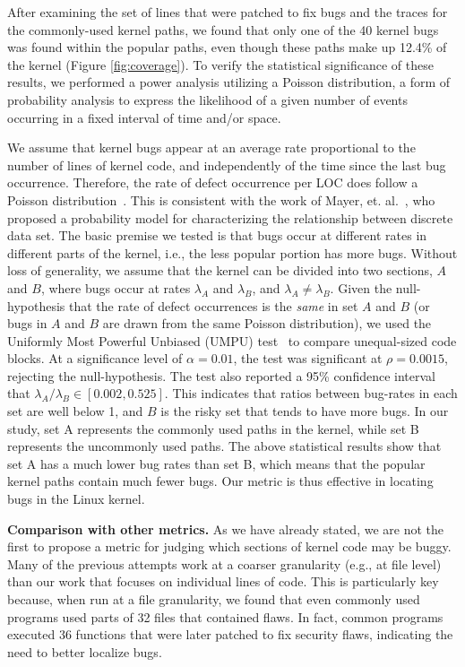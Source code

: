 After examining the set of lines that were patched to fix bugs and the traces for
the commonly-used kernel paths, we found that only one of the 40 kernel bugs
was found within the popular paths, even though these paths make up 12.4\% of the kernel 
(Figure \ref{fig:coverage}). 
To verify the statistical significance of these results, we performed a power
analysis utilizing a Poisson distribution, a form of probability analysis to express the
likelihood of a given number of events occurring in a fixed interval of time
and/or space.

We assume that kernel bugs appear at an average rate proportional to the
number of lines of kernel code, and independently of the time since the last
bug occurrence. Therefore, the rate of defect occurrence per LOC does
follow a Poisson distribution~\cite{Poisson-distribution}.
This is consistent with the work of Mayer, et. al.~\cite{mayer1989probability}, who
proposed a probability model for characterizing the relationship between discrete
data set.
The basic premise we tested is that bugs occur at different rates in different
parts of the kernel,
i.e., the less popular portion has more bugs. Without
loss of generality, we assume that the kernel can be divided into two sections,
$A$ and $B$, where bugs occur at rates $\lambda_A$ and
$\lambda_B$, and $\lambda_A \neq \lambda_B$. Given the null-hypothesis
that the rate of defect occurrences is the \textit{same} in set $A$ and $B$
(or bugs in $A$ and $B$ are drawn from the same Poisson distribution),
we used the Uniformly Most Powerful Unbiased (UMPU) test~\cite{shiue1982experiment}
to compare unequal-sized code blocks.
At a significance level of $\alpha=0.01$, the test was significant at
$\rho=0.0015$, rejecting the null-hypothesis.
The test also reported a 95\% confidence interval that $\lambda_A / \lambda_B
\in [0.002, 0.525]$. This indicates that ratios between bug-rates in each set are well
below 1, and $B$ is the risky set that tends to have more bugs.
In our study, set A represents the commonly used paths in the kernel, while set B
represents the uncommonly used paths. The above statistical results show that
set A has a much lower bug rates than set B, which means that the popular kernel paths
contain much fewer bugs. Our metric is thus effective in locating bugs in the Linux kernel.

\textbf{Comparison with other metrics.}
As we have already stated, we are not the first to propose a metric for judging
which sections of kernel code may be buggy.
Many of the previous attempts work at a coarser granularity (e.g., at file level)
than our work that focuses on
individual lines of code. This is particularly key because, when run at a file
granularity, we found that even commonly used programs used parts of
32 files that contained flaws. In fact, common
programs executed 36 functions that were later patched to fix security
flaws, indicating the need to better localize bugs. 

